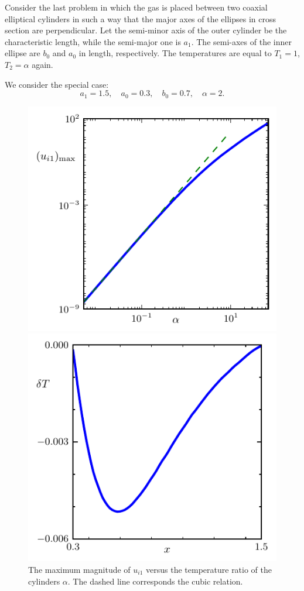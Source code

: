 \documentclass[smallextended, referee]{svjour3} %
\begin{document}
Consider the last problem in which the gas is placed between two coaxial elliptical cylinders
in such a way that the major axes of the ellipses in cross section are perpendicular.
Let the semi-minor axis of the outer cylinder be the characteristic length, while the semi-major one is \(a_1\).
The semi-axes of the inner ellipse are \(b_0\) and \(a_0\) in length, respectively.
The temperatures are equal to \(T_1 = 1\), \(T_2 = \alpha\) again.

We consider the special case:
\[ a_1 = 1.5, \quad a_0 = 0.3, \quad b_0 = 0.7, \quad \alpha = 2. \]

\begin{figure}[ht]
	\centering
	\begin{minipage}{.48\textwidth}
		\centering
		\includegraphics{Fig10}
		\caption{The maximum magnitude of \(u_{i1}\) versus the temperature ratio of the cylinders \(\alpha\).
			The dashed line corresponds the cubic relation.}
		\label{fig:maxU}
	\end{minipage}
	\quad
	\begin{minipage}{.48\textwidth}
		\centering
		\includegraphics{Fig11}

\end{minipage}
\end{figure}
\end{document}
